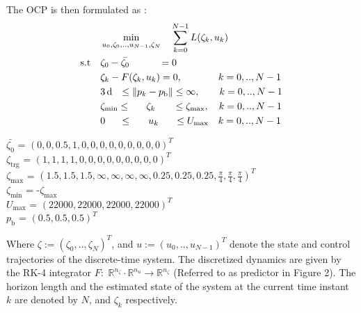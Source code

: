 \documentclass[conference]{IEEEtran}
\begin{document}
The OCP is then formulated as :
\begin{align}
	&\min_{u_0,\zeta_0,..,u_{N-1},\zeta_N} \quad \sum_{k = 0}^{N-1} L(\zeta_k, u_k) \\
	\text{s.t} \quad 
	& \zeta_0 - \bar{\zeta_0} \hspace{0.42in} = 0\\
    & \zeta_k - F(\zeta_k, u_k) = 0, \hspace{0.1in}\quad\qquad k = 0,..,N-1 \\
    & 3\,\mathrm{d} \hspace{0.1in} \le \lVert p_k - p_{\mathrm{b}} \rVert \le  \infty, \qquad  k = 0,..,N-1 \\
	& \zeta_{\mathrm{min}} \le \hspace{0.22in} \zeta_k \hspace{0.25in} \le \zeta_{\mathrm{max}}, \quad k = 0,..,N-1 \\
    & 0 \hspace{0.2in} \le \hspace{0.23in} u_k \hspace{0.22in} \le U_{\mathrm{max}} \quad k = 0,..,N-1
\end{align}

\begin{flushleft}
$\bar{\zeta_0}$ \hspace{0.18in}= $(0, 0, 0.5, 1, 0, 0, 0, 0, 0, 0, 0, 0, 0)^T$\\
$\zeta_{\mathrm{trg}}$ \hspace{0.08in}= $( 1, 1, 1, 1, 0, 0, 0, 0, 0, 0, 0, 0, 0)^T$\\
$\zeta_{\mathrm{max}}$ \hspace{0.03in}= $(1.5,1.5,1.5,\infty,\infty,\infty,\infty,0.25,0.25,0.25,\frac{\pi}{4},\frac{\pi}{4},\frac{\pi}{4})^T$\\
$\zeta_{\mathrm{min}}$ \hspace{0.05in}= -$\zeta_{\mathrm{max}}$\\
$U_{\mathrm{max}}$ = $(22000, 22000, 22000, 22000)^T$\\
$p_\mathrm{b}$ \hspace{0.18in}= $(0.5, 0.5, 0.5)^T$\\
\end{flushleft}

Where $\zeta := (\zeta_0, .., \zeta_N)^T$, and $u := (u_0, .., u_{N-1})^T$ denote the state and control trajectories of the discrete-time system. The discretized dynamics are given by the RK-4 integrator $F :$ $\mathbb{R}^{n_{\zeta}} \cdot \mathbb{R}^{n_{u}} \rightarrow \mathbb{R}^{n_{\zeta}}$ (Referred to as predictor in Figure 2). The horizon length and the estimated state of the system at the current time instant $k$ are denoted by $N$, and $\zeta_k$ respectively.
\end{document}
